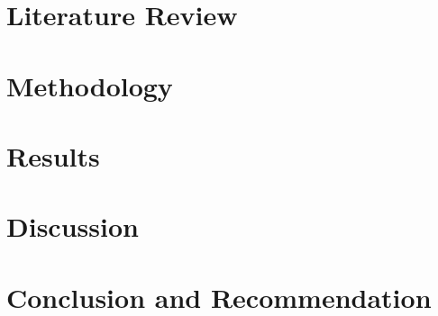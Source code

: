 \documentclass[12pt]{report}
\begin{document}
\chapter{Literature Review}
\label{ch:chapter-02}



\chapter{Methodology}
\label{ch:chapter-03}



\chapter{Results}
\label{ch:chapter-04}



\chapter{Discussion}
\label{ch:chapter-05}



\chapter{Conclusion and Recommendation}
\label{ch:chapter-06}


 




\appendix
{}
\begin{appendices}
    
\end{appendices}
\end{document}

